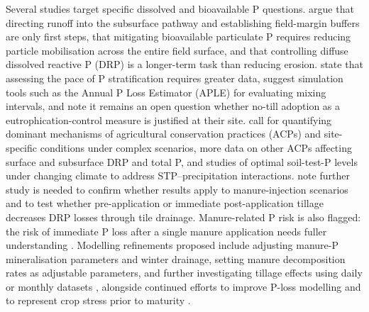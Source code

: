 Several studies target specific dissolved and bioavailable P questions. \textcite{Uusitalo2003} argue that directing runoff into the subsurface pathway and establishing field-margin buffers are only first steps, that mitigating bioavailable particulate P requires reducing particle mobilisation across the entire field surface, and that controlling diffuse dissolved reactive P (DRP) is a longer-term task than reducing erosion. \textcite{Uusitalo2018} state that assessing the pace of P stratification requires greater data, suggest simulation tools such as the Annual P Loss Estimator (APLE) for evaluating mixing intervals, and note it remains an open question whether no-till adoption as a eutrophication-control measure is justified at their site. \textcite{Ni2020} call for quantifying dominant mechanisms of agricultural conservation practices (ACPs) and site-specific conditions under complex scenarios, more data on other ACPs affecting surface and subsurface DRP and total P, and studies of optimal soil-test-P levels under changing climate to address STP--precipitation interactions. \textcite{Wang2018} note further study is needed to confirm whether results apply to manure-injection scenarios and to test whether pre-application or immediate post-application tillage decreases DRP losses through tile drainage. Manure-related P risk is also flagged: the risk of immediate P loss after a single manure application needs fuller understanding \parencite{Madison2014}. Modelling refinements proposed include adjusting manure-P mineralisation parameters and winter drainage, setting manure decomposition rates as adjustable parameters, and further investigating tillage effects using daily or monthly datasets \parencite{Pan2023}, alongside continued efforts to improve P-loss modelling and to represent crop stress prior to maturity \parencite{Wang2019}.

